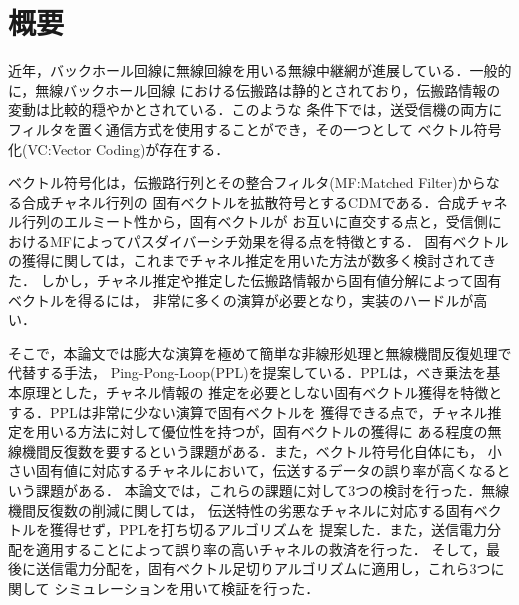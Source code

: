 \chapter*{概要} %
\thispagestyle{empty}

\thispagestyle{empty}
近年，バックホール回線に無線回線を用いる無線中継網が進展している．一般的に，無線バックホール回線
における伝搬路は静的とされており，伝搬路情報の変動は比較的穏やかとされている．このような
条件下では，送受信機の両方にフィルタを置く通信方式を使用することができ，その一つとして
ベクトル符号化(VC:Vector Coding)が存在する．

ベクトル符号化は，伝搬路行列とその整合フィルタ(MF:Matched Filter)からなる合成チャネル行列の
固有ベクトルを拡散符号とするCDMである．合成チャネル行列のエルミート性から，固有ベクトルが
お互いに直交する点と，受信側におけるMFによってパスダイバーシチ効果を得る点を特徴とする．
固有ベクトルの獲得に関しては，これまでチャネル推定を用いた方法が数多く検討されてきた．
しかし，チャネル推定や推定した伝搬路情報から固有値分解によって固有ベクトルを得るには，
非常に多くの演算が必要となり，実装のハードルが高い．

そこで，本論文では膨大な演算を極めて簡単な非線形処理と無線機間反復処理で代替する手法，
Ping-Pong-Loop(PPL)を提案している．PPLは，べき乗法を基本原理とした，チャネル情報の
推定を必要としない固有ベクトル獲得を特徴とする．PPLは非常に少ない演算で固有ベクトルを
獲得できる点で，チャネル推定を用いる方法に対して優位性を持つが，固有ベクトルの獲得に
ある程度の無線機間反復数を要するという課題がある．また，ベクトル符号化自体にも，
小さい固有値に対応するチャネルにおいて，伝送するデータの誤り率が高くなるという課題がある．
本論文では，これらの課題に対して3つの検討を行った．無線機間反復数の削減に関しては，
伝送特性の劣悪なチャネルに対応する固有ベクトルを獲得せず，PPLを打ち切るアルゴリズムを
提案した．また，送信電力分配を適用することによって誤り率の高いチャネルの救済を行った．
そして，最後に送信電力分配を，固有ベクトル足切りアルゴリズムに適用し，これら3つに関して
シミュレーションを用いて検証を行った．
